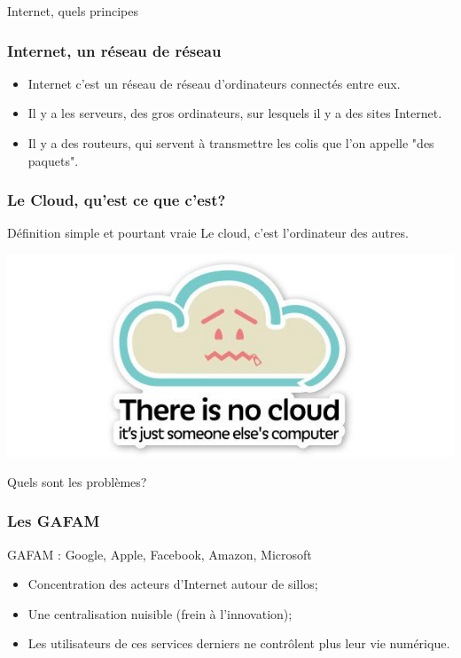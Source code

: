 \documentclass{beamer}
\begin{document}
\begin{frame}
\begin{center}
\Huge{Internet, quels principes}
\end{center}
\end{frame}

\begin{frame}
\frametitle{Internet, un réseau de réseau}
\begin{itemize}
\item Internet c'est un réseau de réseau d'ordinateurs connectés entre eux.
\item Il y a les serveurs, des gros ordinateurs, sur lesquels il y a des sites Internet.
\item Il y a des routeurs, qui servent à transmettre les colis que l'on appelle "des paquets". 
\end{itemize}
\end{frame}
\begin{frame}
\frametitle{Le Cloud, qu'est ce que c'est?}
\begin{block}{Définition simple et pourtant vraie}
Le cloud, c'est l'ordinateur des autres.
\end{block}
\begin{center}
\includegraphics[scale=0.4]{./images/cloud.png}
\end{center}
\end{frame}
\begin{frame}
\begin{center}
\Huge{Quels sont les problèmes?}
\end{center}
\end{frame}
\begin{frame}
\frametitle{Les GAFAM}
GAFAM : Google, Apple, Facebook, Amazon, Microsoft
\begin{itemize}
\item Concentration des acteurs d’Internet autour de sillos;
\item Une centralisation nuisible (frein à l'innovation);
\item  Les utilisateurs de ces services derniers ne contrôlent plus leur vie numérique.
\end{itemize}
\end{frame}
\end{document}
